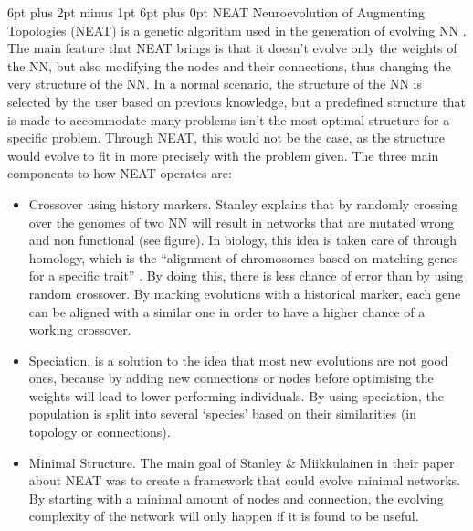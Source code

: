 \documentclass[12pt,a4paper]{article}
\makeatletter
\renewcommand\subsection{\@startsection {subsection}{1}{2mm} %
                               {6pt plus 2pt minus 1pt} %
                               {6pt plus 0pt} %
                               {\normalfont\bfseries}}
\makeatother
\begin{document}
\subsection{NEAT}
Neuroevolution of Augmenting Topologies (NEAT) is a genetic algorithm used in the generation of evolving NN \cite{stanley_evolving_2002}. The main feature that NEAT brings is that it doesn’t evolve only the weights of the NN, but also modifying the nodes and their connections, thus changing the very structure of the NN. In a normal scenario, the structure of the NN is selected by the user based on previous knowledge, but a predefined structure that is made to accommodate many problems isn’t the most optimal structure for a specific problem. Through NEAT, this would not be the case, as the structure would evolve to fit in more precisely with the problem given.
The three main components to how NEAT operates are:
\begin{itemize}
	\item Crossover using history markers. Stanley explains that by randomly crossing over the genomes of two NN will result in networks that are mutated wrong and non functional (see figure). In biology, this idea is taken care of through homology, which is the “alignment of chromosomes based on matching genes for a specific trait” \cite{heidenreich_neat:_2019}. By doing this, there is less chance of error than by using random crossover. By marking evolutions with a historical marker, each gene can be aligned with a similar one in order to have a higher chance of a working crossover.
	\item Speciation, is a solution to the idea that most new evolutions are not good ones, because by adding new connections or nodes before optimising the weights will lead to lower performing individuals. By using speciation, the population is split into several ‘species’ based on their similarities (in topology or connections).
	\item Minimal Structure. The main goal of Stanley \& Miikkulainen in their paper about NEAT was to create a framework that could evolve minimal networks. By starting with a minimal amount of nodes and connection, the evolving complexity of the network will only happen if it is found to be useful.
\end{itemize}
\end{document}
